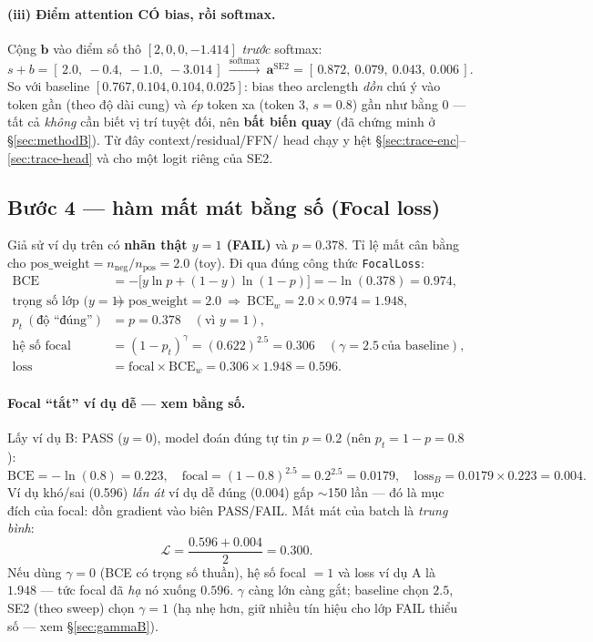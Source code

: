 \documentclass[11pt]{article}
\newcommand{\code}[1]{\textcolor{cInk}{\texttt{#1}}}
\theoremstyle{definition}
\begin{document}
\paragraph{(iii) Điểm attention CÓ bias, rồi softmax.} Cộng $\mathbf{b}$ vào điểm
số thô $[2,0,0,-1.414]$ \emph{trước} softmax:
\[
s+b=[\,2.0,\ -0.4,\ -1.0,\ -3.014\,]\ \xrightarrow{\text{softmax}}\
\mathbf{a}^{\text{SE2}}=[\,0.872,\ 0.079,\ 0.043,\ 0.006\,].
\]
So với baseline $[0.767,0.104,0.104,0.025]$: bias theo arclength \emph{dồn} chú ý
vào token gần (theo độ dài cung) và \emph{ép} token xa (token 3, $s{=}0.8$) gần
như bằng 0 --- tất cả \emph{không} cần biết vị trí tuyệt đối, nên \textbf{bất
biến quay} (đã chứng minh ở \S\ref{sec:methodB}). Từ đây context/residual/FFN/
head chạy y hệt \S\ref{sec:trace-enc}--\ref{sec:trace-head} và cho một logit
riêng của SE2.

\subsection{Bước 4 --- hàm mất mát bằng số (Focal loss)}
\label{sec:trace-loss}
Giả sử ví dụ trên có \textbf{nhãn thật $y=1$ (FAIL)} và $p=0.378$. Tỉ lệ mất cân
bằng cho $\text{pos\_weight}=n_{\text{neg}}/n_{\text{pos}}=2.0$ (toy). Đi qua
đúng công thức \code{FocalLoss}:
\begin{align*}
\text{BCE}&=-\big[y\ln p+(1{-}y)\ln(1{-}p)\big]=-\ln(0.378)=0.974,\\
\text{trọng số lớp (}y{=}1\text{)}&=\text{pos\_weight}=2.0\ \Rightarrow\
\text{BCE}_w=2.0\times0.974=1.948,\\
p_t\ (\text{độ ``đúng''})&=p=0.378\quad(\text{vì }y{=}1),\\
\text{hệ số focal}&=(1-p_t)^\gamma=(0.622)^{2.5}=0.306\quad(\gamma{=}2.5\ \text{của baseline}),\\
\boxed{\text{loss}}&=\text{focal}\times\text{BCE}_w=0.306\times1.948=\boxed{0.596}.
\end{align*}

\paragraph{Focal ``tắt'' ví dụ dễ --- xem bằng số.} Lấy ví dụ B: PASS ($y{=}0$),
model đoán đúng tự tin $p=0.2$ (nên $p_t=1{-}p=0.8$):
\[
\text{BCE}=-\ln(0.8)=0.223,\quad
\text{focal}=(1-0.8)^{2.5}=0.2^{2.5}=0.0179,\quad
\text{loss}_B=0.0179\times0.223=\mathbf{0.004}.
\]
Ví dụ khó/sai (0.596) \emph{lấn át} ví dụ dễ đúng (0.004) gấp $\sim$150 lần ---
đó là mục đích của focal: dồn gradient vào biên PASS/FAIL. Mất mát của batch là
\emph{trung bình}:
\[
\mathcal{L}=\frac{0.596+0.004}{2}=\mathbf{0.300}.
\]
Nếu dùng $\gamma{=}0$ (BCE có trọng số thuần), hệ số focal $=1$ và loss ví dụ A là
$1.948$ --- tức focal đã \emph{hạ} nó xuống $0.596$. $\gamma$ càng lớn càng gắt;
baseline chọn $2.5$, SE2 (theo sweep) chọn $\gamma{=}1$ (hạ nhẹ hơn, giữ nhiều
tín hiệu cho lớp FAIL thiểu số --- xem \S\ref{sec:gammaB}).
\end{document}
